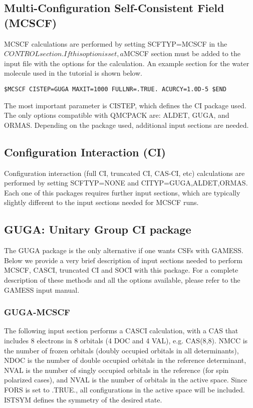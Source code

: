 \subsection{Multi-Configuration Self-Consistent Field (MCSCF)}
MCSCF calculations are performed by setting SCFTYP=MCSCF in the $CONTROL
section. If this option is set, a $MCSCF section must be added to the input file with the
options for the calculation. An example section for the water molecule used in the tutorial
is shown below.

\begin{lstlisting}
$MCSCF CISTEP=GUGA MAXIT=1000 FULLNR=.TRUE. ACURCY=1.0D-5 $END
\end{lstlisting}

The most important parameter is CISTEP, which defines the CI package used. The only
options compatible with QMCPACK are: ALDET, GUGA, and ORMAS. Depending on the
package used, additional input sections are needed.


\subsection{Configuration Interaction (CI)}
Configuration interaction (full CI, truncated CI, CAS-CI, etc) calculations are performed
by setting SCFTYP=NONE and CITYP=GUGA,ALDET,ORMAS. Each one of this packages 
requires further input sections, which are typically slightly different to the input sections
needed for MCSCF runs.


\subsection{GUGA: Unitary Group CI package}
The GUGA package is the only alternative if one wants CSFs with GAMESS. Below
we provide a very brief description of input sections needed to perform MCSCF, CASCI,
truncated CI and SOCI with this package. For a complete description of these methods and
all the options available, please refer to the GAMESS input manual.

\subsubsection{GUGA-MCSCF}
The following input section performs a CASCI calculation, with a CAS that includes 8
electrons in 8 orbitals (4 DOC and 4 VAL), e.g. CAS(8,8). NMCC is the number of frozen
orbitals (doubly occupied orbitals in all determinants), NDOC is the number of double
occupied orbitals in the reference determinant, NVAL is the number of singly occupied
orbitals in the reference (for spin polarized cases), and NVAL is the number of orbitals in
the active space. Since FORS is set to .TRUE., all configurations in the active space will
be included. ISTSYM defines the symmetry of the desired state.

